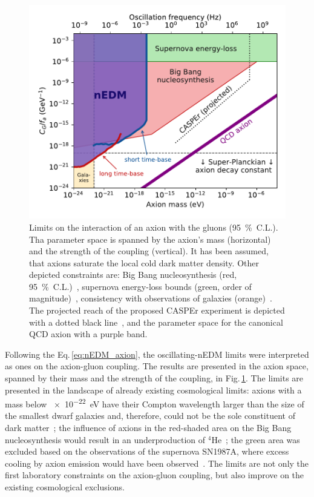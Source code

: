 \begin{figure}
  \centering
  \includegraphics[width=\linewidth]{gfx/axions/psi_ill_axion_limits_v7.pdf}
  \caption{Limits on the interaction of an axion with the gluons (\SI{95}{\percent}~C.L.). Tha parameter space is spanned by the axion's mass (horizontal) and the strength of the coupling (vertical). It has been assumed, that axions saturate the local cold dark matter density. Other depicted constraints are: Big Bang nucleosynthesis (red, \SI{95}{\percent}~C.L.)~\cite{Blum2014,StadnikThesis,Stadnik2015D}, supernova energy-loss bounds (green, order of magnitude)~\cite{Graham2013,Raffelt1990Review,Raffelt2008LNP}, consistency with observations of galaxies (orange)~\cite{Marsh2015Review,Marsh2015B,Schive2015,Marsh2017}. The projected reach of the proposed CASPEr experiment is depicted with a dotted black line~\cite{CASPEr2014}, and the parameter space for the canonical QCD axion with a purple band.}
\label{fig:axions_limits_coupling}
\end{figure}

Following the Eq.\,\ref{eq:nEDM_axion}, the oscillating-nEDM limits were interpreted as ones on the axion-gluon coupling. The results are presented in the axion space, spanned by their mass and the strength of the coupling, in Fig.\,\ref{fig:axions_limits_coupling}. The limits are presented in the landscape of already existing cosmological limits: axions with a mass below \SI{e-22}{\electronvolt} have their Compton wavelength larger than the size of the smallest dwarf galaxies and, therefore, could not be the sole constituent of dark matter~\cite{Marsh2015Review}; the influence of axions in the red-shaded area on the Big Bang nucleosynthesis would result in an underproduction of ${}^4$He~\cite{Blum2014}; the green area was excluded based on the observations of the supernova SN1987A, where excess cooling by axion emission would have been observed~\cite{Graham2013}. The limits are not only the first laboratory constraints on the axion-gluon coupling, but also improve on the existing cosmological exclusions.




